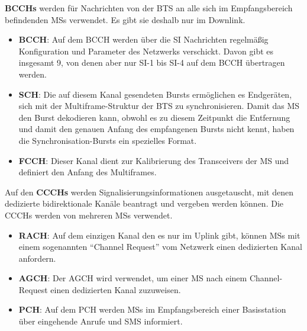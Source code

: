 \textbf{\acfp{BCCH}} werden für Nachrichten von der \ac{BTS} an alle sich im Empfangsbereich befindenden \acp{MS} verwendet. Es gibt sie deshalb nur im Downlink. 
\begin{itemize}
\item \textbf{\ac{BCCH}}: Auf dem \ac{BCCH} werden über die \ac{SI} Nachrichten regelmäßig Konfiguration und Parameter des Netzwerks verschickt. Davon gibt es insgesamt 9, von denen aber nur \ac{SI}-1 bis \ac{SI}-4 auf dem \ac{BCCH} übertragen werden.
\item \textbf{\ac{SCH}}: Die auf diesem Kanal gesendeten Bursts ermöglichen es Endgeräten, sich mit der Multiframe-Struktur der \ac{BTS} zu synchronisieren. Damit das \ac{MS} den Burst dekodieren kann, obwohl es zu diesem Zeitpunkt die Entfernung und damit den genauen Anfang des empfangenen Bursts nicht kennt, haben die Synchronisation-Bursts ein spezielles Format.
\item \textbf{\ac{FCCH}}: Dieser Kanal dient zur Kalibrierung des Transceivers der \ac{MS} und definiert den Anfang des Multiframes.
\end{itemize}

Auf den \textbf{\acfp{CCCH}} werden Signalisierungsinformationen ausgetauscht, mit denen dedizierte bidirektionale Kanäle beantragt und vergeben werden können. Die \acp{CCCH} werden von mehreren \acp{MS} verwendet. 
\begin{itemize}
\item \textbf{\ac{RACH}}: Auf dem einzigen Kanal den es nur im Uplink gibt, können \acp{MS} mit einem sogenannten "`Channel Request"' vom Netzwerk einen dedizierten Kanal anfordern.
\item \textbf{\ac{AGCH}}: Der \ac{AGCH} wird verwendet, um einer \ac{MS} nach einem Channel-Request einen dedizierten Kanal zuzuweisen.
\item \textbf{\ac{PCH}}: Auf dem \ac{PCH} werden \acp{MS} im Empfangsbereich einer Basisstation über eingehende Anrufe und \ac{SMS} informiert.
\end{itemize} 

